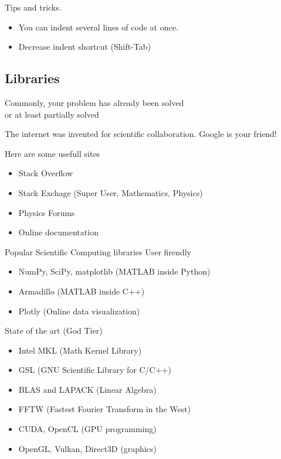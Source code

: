 \documentclass[xcolor={dvipsnames}]{beamer}
\begin{document}
\begin{frame}{Tips and tricks.}{}
\begin{itemize}
\item You can indent several lines of code at once.
\item Decrease indent shortcut (Shift-Tab)
\end{itemize}
\end{frame}


\subsection{Libraries}
\begin{frame}{Commonly, your problem has already been solved\\ or at least partially solved}{}

The internet was invented for scientific collaboration. Google is your friend!
 
\bigskip
Here are some usefull sites
\begin{itemize}
\item Stack Overflow
\item Stack Exchage (Super User, Mathematics, Physics)
\item Physics Forums
\item Online documentation
\end{itemize}

\end{frame}

\begin{frame}{Popular Scientific Computing libraries}{}
User firendly
\begin{itemize}
	\item NumPy, SciPy, matplotlib (MATLAB inside Python)
	\item Armadillo (MATLAB inside C++)
	\item Plotly (Online data visualization)
\end{itemize}

\bigskip
State of the art (God Tier)
\begin{itemize}
	\item Intel MKL (Math Kernel Library)
	\item GSL (GNU Scientific Library for C/C++)
	\item BLAS and LAPACK (Linear Algebra)
	\item FFTW (Fastest Fourier Transform in the West)
	\item CUDA, OpenCL (GPU programming)
	\item OpenGL, Vulkan, Direct3D (graphics)
\end{itemize}
\end{frame}
\end{document}
